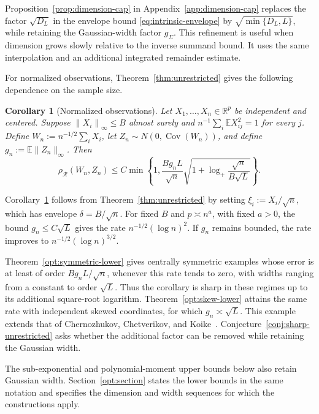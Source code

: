 \documentclass[11pt,letterpaper]{article}
\newenvironment{vSixBlock}{\color{magenta}}{}
\newtheorem{corollary}{Corollary}
\theoremstyle{remark}
\newcommand{\E}{\mathbb E}
\newcommand{\R}{\mathbb R}
\newcommand{\Cov}{\operatorname{Cov}}
\newcommand{\norm}[1]{\left\lVert#1\right\rVert}
\newcommand{\rh}{\rho_{\mathcal R}}
\begin{document}
Proposition~\ref{prop:dimension-cap} in Appendix~\ref{app:dimension-cap}
replaces the factor \(\sqrt{D_L}\) in the envelope bound
\eqref{eq:intrinsic-envelope} by \(\sqrt{\min\{D_L,L\}}\),
while retaining the Gaussian-width factor \(g_\Sigma\).
This refinement is useful when dimension grows slowly relative to the
inverse summand bound. It uses the same interpolation and an additional
integrated remainder estimate.

For normalized observations, Theorem~\ref{thm:unrestricted} gives
the following dependence on the sample size.

\begin{corollary}[Normalized observations]\label{cor:observations}
\begin{vSixBlock}
Let \(X_1,\ldots,X_n\in\R^p\) be independent and centered. Suppose
\(\norm{X_i}_\infty\le B\) almost surely and
\(n^{-1}\sum_i\E X_{ij}^2=1\) for every \(j\). Define
\(W_n:=n^{-1/2}\sum_iX_i\), let \(Z_n\sim N(0,\Cov(W_n))\),
and define \(g_n:=\E\|Z_n\|_\infty\). Then
\begin{equation}\label{eq:observations-intrinsic}
 \rh(W_n,Z_n)\le C\min\!\left\{1,
 \frac{B g_n L}{\sqrt n}
 \sqrt{1+\log_+\frac{\sqrt n}{B\sqrt L}}\right\}.
\end{equation}
\end{vSixBlock}
\end{corollary}

\begin{vSixBlock}
Corollary~\ref{cor:observations} follows from Theorem~\ref{thm:unrestricted}
by setting \(\xi_i:=X_i/\sqrt n\), which has envelope
\(\delta=B/\sqrt n\). For fixed \(B\) and \(p\asymp n^a\), with
fixed \(a>0\), the bound \(g_n\le C\sqrt L\) gives the rate
\(n^{-1/2}(\log n)^2\). If \(g_n\) remains bounded, the rate improves
to \(n^{-1/2}(\log n)^{3/2}\).

Theorem~\ref{opt:symmetric-lower} gives centrally symmetric examples
whose error is at least of order \(B g_nL/\sqrt n\), whenever
this rate tends to zero, with widths ranging from a constant to
order \(\sqrt L\). Thus the corollary is sharp in these regimes
up to its additional square-root logarithm. Theorem~\ref{opt:skew-lower}
attains the same rate with independent skewed coordinates, for which
\(g_n\asymp\sqrt L\). This example extends that of
Chernozhukov, Chetverikov, and Koike~\cite[Proposition~2.1]{CCK}.
Conjecture~\ref{conj:sharp-unrestricted} asks whether the additional
factor can be removed while retaining the Gaussian width.

The sub-exponential and polynomial-moment upper bounds below also
retain Gaussian width. Section~\ref{opt:section} states the lower
bounds in the same notation and specifies the dimension and width
sequences for which the constructions apply.
\end{vSixBlock}
\end{document}
